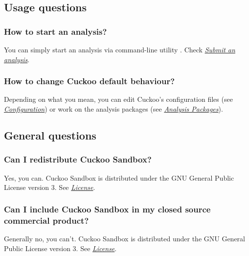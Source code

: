 \documentclass[letterpaper,10pt,english]{sphinxmanual}
\begin{document}
\subsection{Usage questions}
\label{faq/index:usage-questions}

\subsubsection{How to start an analysis?}
\label{faq/index:question-1}\label{faq/index:how-to-start-an-analysis}
You can simply start an analysis via command-line utility .
Check {\hyperref[usage/submit::doc]{\emph{Submit an analysis}}}.


\subsubsection{How to change Cuckoo default behaviour?}
\label{faq/index:how-to-change-cuckoo-default-behaviour}\label{faq/index:question-2}
Depending on what you mean, you can edit Cuckoo's configuration files (see
{\hyperref[installation/host/configuration::doc]{\emph{Configuration}}}) or work on the analysis packages
(see {\hyperref[customization/packages::doc]{\emph{Analysis Packages}}}).


\subsection{General questions}
\label{faq/index:general-questions}

\subsubsection{Can I redistribute Cuckoo Sandbox?}
\label{faq/index:question-3}\label{faq/index:can-i-redistribute-cuckoo-sandbox}
Yes, you can. Cuckoo Sandbox is distributed under the GNU General Public
License version 3. See {\hyperref[introduction/license::doc]{\emph{License}}}.


\subsubsection{Can I include Cuckoo Sandbox in my closed source commercial product?}
\label{faq/index:can-i-include-cuckoo-sandbox-in-my-closed-source-commercial-product}\label{faq/index:question-4}
Generally no, you can't. Cuckoo Sandbox is distributed under the GNU General
Public License version 3. See {\hyperref[introduction/license::doc]{\emph{License}}}.
\end{document}

